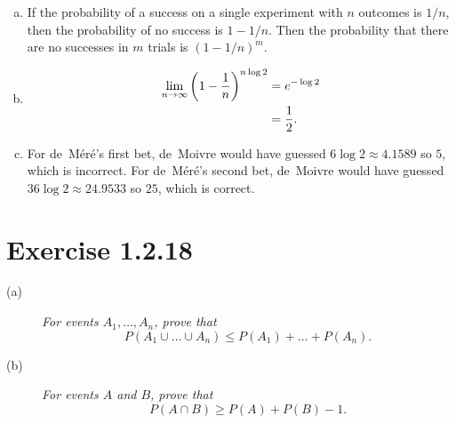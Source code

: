 \documentclass{tufte-handout}
\begin{document}
\begin{enumerate}[(a)]
\item If the probability of a success on a single experiment with $n$
  outcomes is $1/n$, then the probability of no success is $1 -
  1/n$. Then the probability that there are no successes in $m$ trials
  is ${(1 - 1/n)}^m$.
\item
  \begin{align*}
    \lim_{n \rightarrow \infty} {\left( 1 - {1 \over n}\right)}^{n
    \log 2} &= e^{ -\log 2} \\
            &= {1 \over 2}.
  \end{align*}
\item For de~M\'er\'e's first bet, de~Moivre would have guessed $6
  \log 2 \approx 4.1589$ so $5$, which is incorrect. For de~M\'er\'e's
  second bet, de~Moivre would have guessed $36 \log 2 \approx 24.9533$
  so $25$, which is correct.
\end{enumerate}

\section{Exercise 1.2.18}

\begin{description}
\item[(a)] \textit{For events $A_1,\dots, A_n$, prove that
  \[
  P(A_1 \cup \dots \cup A_n) \leq P(A_1) + \dots + P(A_n).
  \]}
\item[(b)] \textit{For events $A$ and $B$, prove that
  \[
  P(A \cap B) \geq P(A) + P(B) - 1.
  \]}
\end{description}

\end{document}
